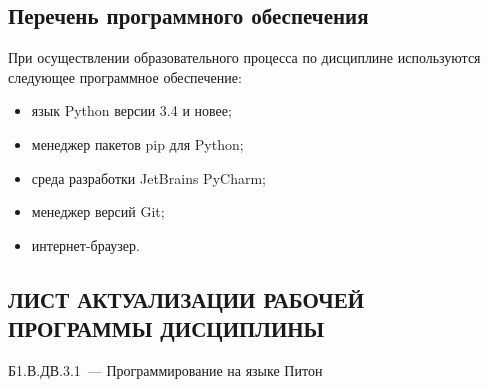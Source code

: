 \documentclass[a4paper,12pt]{article}
\begin{document}
\subsection{Перечень программного обеспечения}
При осуществлении образовательного процесса по дисциплине используются следующее программное обеспечение:
\begin{itemize}[nolistsep]
  
\item язык Python версии 3.4 и новее;
  
\item менеджер пакетов pip для Python;
  
\item среда разработки JetBrains PyCharm;
  
\item менеджер версий Git;
  
\item интернет-браузер.
  
\end{itemize}



\newpage
\begin{center}
\section*{ЛИСТ АКТУАЛИЗАЦИИ РАБОЧЕЙ ПРОГРАММЫ ДИСЦИПЛИНЫ}
Б1.В.ДВ.3.1\ --- Программирование на языке Питон 
\end{center}
\end{document}
